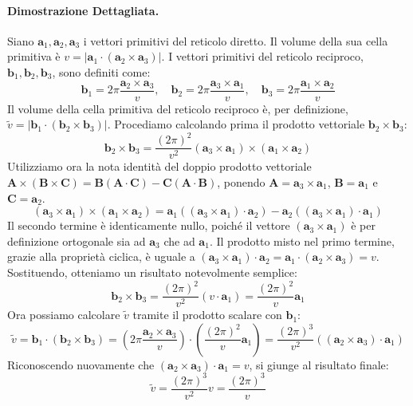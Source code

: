 \paragraph{Dimostrazione Dettagliata.}
Siano \(\mathbf{a}_1, \mathbf{a}_2, \mathbf{a}_3\) i vettori primitivi del reticolo diretto. Il volume della sua cella primitiva è \(v = |\mathbf{a}_1 \cdot (\mathbf{a}_2 \times \mathbf{a}_3)|\). I vettori primitivi del reticolo reciproco, \(\mathbf{b}_1, \mathbf{b}_2, \mathbf{b}_3\), sono definiti come:
\[ \mathbf{b}_1 = 2\pi \frac{\mathbf{a}_2 \times \mathbf{a}_3}{v}, \quad \mathbf{b}_2 = 2\pi \frac{\mathbf{a}_3 \times \mathbf{a}_1}{v}, \quad \mathbf{b}_3 = 2\pi \frac{\mathbf{a}_1 \times \mathbf{a}_2}{v} \]
Il volume della cella primitiva del reticolo reciproco è, per definizione, \(\tilde{v} = |\mathbf{b}_1 \cdot (\mathbf{b}_2 \times \mathbf{b}_3)|\). Procediamo calcolando prima il prodotto vettoriale \(\mathbf{b}_2 \times \mathbf{b}_3\):
\[ \mathbf{b}_2 \times \mathbf{b}_3 = \frac{(2\pi)^2}{v^2} (\mathbf{a}_3 \times \mathbf{a}_1) \times (\mathbf{a}_1 \times \mathbf{a}_2) \]
Utilizziamo ora la nota identità del doppio prodotto vettoriale \(\mathbf{A} \times (\mathbf{B} \times \mathbf{C}) = \mathbf{B}(\mathbf{A} \cdot \mathbf{C}) - \mathbf{C}(\mathbf{A} \cdot \mathbf{B})\), ponendo \(\mathbf{A} = \mathbf{a}_3 \times \mathbf{a}_1\), \(\mathbf{B} = \mathbf{a}_1\) e \(\mathbf{C} = \mathbf{a}_2\).
\[ (\mathbf{a}_3 \times \mathbf{a}_1) \times (\mathbf{a}_1 \times \mathbf{a}_2) = \mathbf{a}_1 ((\mathbf{a}_3 \times \mathbf{a}_1) \cdot \mathbf{a}_2) - \mathbf{a}_2 ((\mathbf{a}_3 \times \mathbf{a}_1) \cdot \mathbf{a}_1) \]
Il secondo termine è identicamente nullo, poiché il vettore \((\mathbf{a}_3 \times \mathbf{a}_1)\) è per definizione ortogonale sia ad \(\mathbf{a}_3\) che ad \(\mathbf{a}_1\).
Il prodotto misto nel primo termine, grazie alla proprietà ciclica, è uguale a \((\mathbf{a}_3 \times \mathbf{a}_1) \cdot \mathbf{a}_2 = \mathbf{a}_1 \cdot (\mathbf{a}_2 \times \mathbf{a}_3) = v\).
Sostituendo, otteniamo un risultato notevolmente semplice:
\[ \mathbf{b}_2 \times \mathbf{b}_3 = \frac{(2\pi)^2}{v^2} (v \cdot \mathbf{a}_1) = \frac{(2\pi)^2}{v} \mathbf{a}_1 \]
Ora possiamo calcolare \(\tilde{v}\) tramite il prodotto scalare con \(\mathbf{b}_1\):
\[ \tilde{v} = \mathbf{b}_1 \cdot (\mathbf{b}_2 \times \mathbf{b}_3) = \left( 2\pi \frac{\mathbf{a}_2 \times \mathbf{a}_3}{v} \right) \cdot \left( \frac{(2\pi)^2}{v} \mathbf{a}_1 \right) = \frac{(2\pi)^3}{v^2} ((\mathbf{a}_2 \times \mathbf{a}_3) \cdot \mathbf{a}_1) \]
Riconoscendo nuovamente che \((\mathbf{a}_2 \times \mathbf{a}_3) \cdot \mathbf{a}_1 = v\), si giunge al risultato finale:
\[ \tilde{v} = \frac{(2\pi)^3}{v^2} v = \frac{(2\pi)^3}{v} \]

